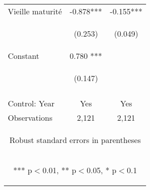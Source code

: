 \begin{center}
\begin{tabular}{lcc}
Vieille maturité & -0.878*** & -0.155*** \\
\vspace{4pt} & \begin{footnotesize}(0.253)\end{footnotesize} & \begin{footnotesize}(0.049)\end{footnotesize} \\
Constant &  0.780 *** &  \\
 & \begin{footnotesize}(0.147)\end{footnotesize} & \begin{footnotesize}\end{footnotesize} \\
\vspace{4pt} & \begin{footnotesize}\end{footnotesize} & \begin{footnotesize}\end{footnotesize} \\
Control: Year & Yes & Yes \\ \hline
Observations & 2,121 & 2,121 \\ \hline
\multicolumn{3}{c}{\begin{footnotesize} Robust standard errors in parentheses\end{footnotesize}} \\
\multicolumn{3}{c}{\begin{footnotesize} *** p$<$0.01, ** p$<$0.05, * p$<$0.1\end{footnotesize}} \\
\end{tabular}
\end{center}


